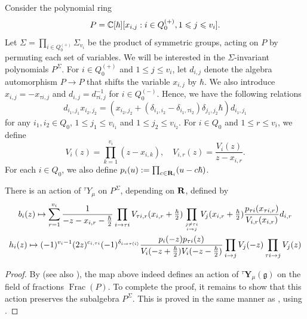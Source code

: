  Consider the polynomial ring
$$ P = \mathbb{C}[\hbar][x_{i,j} : i \in Q_0^{(+)}, 1 \leqslant j \leqslant v_i ]. $$
Let $ \Sigma = \prod_{i \in  Q_0^{(+)}} \Sigma_{v_i} $ be the product of symmetric groups, acting on $P$ by permuting each set of variables.  We will be interested in the $\Sigma$-invariant polynomials $P^\Sigma$. For $i\in Q_0^{(+)}$ and $1\leq j\leq v_i$, let $d_{i,j}$ denote the algebra automorphism $P\to P$ that shifts the variable $x_{i,j}$ by $\hbar$. We also introduce $x_{i,j}=-x_{\tau i,j}$ and $d_{i,j}=d_{\tau i,j}^{-1}$ for $i\in Q_0^{(-)}$. 
Hence, we have the following relations
$$
d_{i_1,j_1}x_{i_2,j_2}
=
(x_{i_2,j_2}+
(\delta_{i_1,i_2}
-\delta_{i_1,\tau i_2 })
\delta_{j_1,j_2}\hbar
)d_{i_1,j_1}
$$
for any $i_1,i_2\in Q_0$, $1\leq j_1\leq v_{i_1}$ and $1\leq j_2\leq v_{i_2}$. 
For $i\in Q_0$ and $1\leq r\leq v_i$, we define
$$V_i(z) = \prod_{k=1}^{v_i}(z-x_{i,k}),\quad V_{i,r}(z)=\frac{V_i(z)}{z-x_{i,r}}.$$
 For each $i\in Q_0$, we also define
 $p_i(u):=\prod_{c\in \mathbf{R}_i}(u-c\hbar)$.
\begin{prop} 
    \label{prop:iGKLO} 
    There is an action of ${}^\tau Y_\mu $ on $P^\Sigma$, depending on $\mathbf{R}$, defined by 
    \begin{gather}
       \label{biGKLO} b_i(z)\mapsto  \sum_{r=1}^{v_i}\frac{1}{-z-x_{i,r}-\tfrac{\hbar}{2}} \prod_{i\to \tau i}V_{\tau i,r}(x_{i,r}+\tfrac{\hbar}{2})\prod_{j\neq \tau i \atop i \to j}V_{j}(x_{i,r}+\tfrac{\hbar}{2})\frac{p_{\tau i}(x_{\tau i,r})}{V_{i,r}(x_{i,r})}d_{i,r}\\
       \label{hiGKLO}
       h_i(z) \mapsto (-1)^{v_i-1}(2z)^{c_{i,\tau i}}(-1)^{\delta_{i\to \tau(i)}}\frac{p_i(-z)p_{\tau i}(z)}{V_i(-z+\frac{\hbar}{2})V_i(-z-\tfrac{\hbar}{2})}\prod_{i\to j}V_{j}(-z)\prod_{\tau i \to j}V_{j}(z)
    \end{gather}
\end{prop}
\begin{proof}
 By \cite[Thm.~4.2]{SSX25} (see also \cite[Thm.~3.5]{LWW2}), the map above indeed defines an action of ${}^{\tau}\mathbf{Y}_{\mu}(\mathfrak{g})$ on the field of fractions $\operatorname{Frac}(P)$. To complete the proof, it remains to show that this action preserves the subalgebra $P^{\Sigma}$.  
This is proved in the same manner as \cite[Thm.~4.6]{KTWWY19}, using \cite[Lem.~4.7]{KTWWY19}.
\end{proof}


